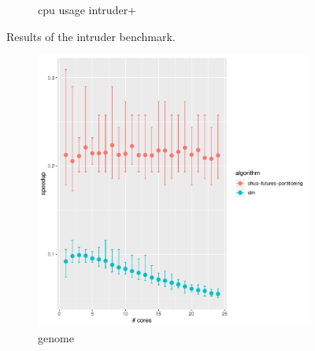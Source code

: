 \begin{figure}
\begin{subfigure}[t]{.32\textwidth}
        \caption{cpu usage intruder+}%
    \end{subfigure}%
    \caption{Results of the intruder benchmark.}%
    \label{fig:evaulation:intruder}
\end{figure}

\begin{figure}
    \centering
    \begin{subfigure}[t]{.32\textwidth}
        \includegraphics[width=\textwidth,keepaspectratio]{gfx/results/genome/genome}
        \caption{genome}%
    \end{subfigure}%
    ~
    \begin{subfigure}[t]{.32\textwidth}

\end{subfigure}
\end{figure}
